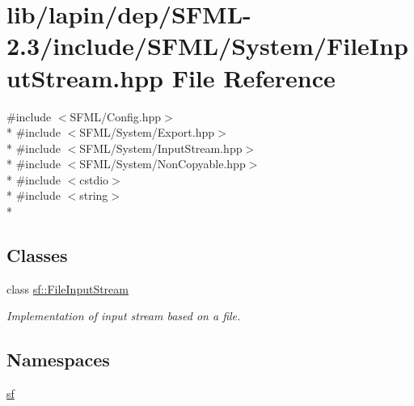 \hypertarget{lapin_2dep_2_s_f_m_l-2_83_2include_2_s_f_m_l_2_system_2_file_input_stream_8hpp}{\section{lib/lapin/dep/\-S\-F\-M\-L-\/2.3/include/\-S\-F\-M\-L/\-System/\-File\-Input\-Stream.hpp File Reference}
\label{lapin_2dep_2_s_f_m_l-2_83_2include_2_s_f_m_l_2_system_2_file_input_stream_8hpp}
}
{\ttfamily \#include $<$S\-F\-M\-L/\-Config.\-hpp$>$}\\*
{\ttfamily \#include $<$S\-F\-M\-L/\-System/\-Export.\-hpp$>$}\\*
{\ttfamily \#include $<$S\-F\-M\-L/\-System/\-Input\-Stream.\-hpp$>$}\\*
{\ttfamily \#include $<$S\-F\-M\-L/\-System/\-Non\-Copyable.\-hpp$>$}\\*
{\ttfamily \#include $<$cstdio$>$}\\*
{\ttfamily \#include $<$string$>$}\\*
\subsection*{Classes}
\begin{DoxyCompactItemize}
\item 
class \hyperlink{classsf_1_1_file_input_stream}{sf\-::\-File\-Input\-Stream}
\begin{DoxyCompactList}\small\item\em Implementation of input stream based on a file. \end{DoxyCompactList}\end{DoxyCompactItemize}
\subsection*{Namespaces}
\begin{DoxyCompactItemize}
\item 
\hyperlink{namespacesf}{sf}
\end{DoxyCompactItemize}
